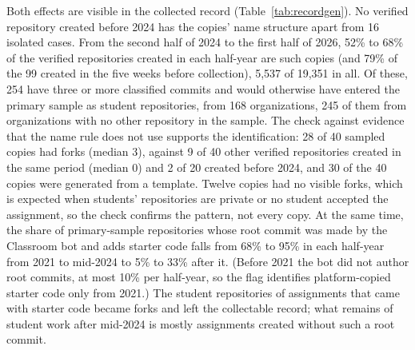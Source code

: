 \documentclass[acmsmall,screen,review,anonymous]{acmart}
\begin{document}
Both effects are visible in the collected record (Table~\ref{tab:recordgen}). No verified repository created before 2024 has the copies' name structure apart from 16 isolated cases. From the second half of 2024 to the first half of 2026, 52\% to 68\% of the verified repositories created in each half-year are such copies (and 79\% of the 99 created in the five weeks before collection), 5,537 of 19,351 in all. Of these, 254 have three or more classified commits and would otherwise have entered the primary sample as student repositories, from 168 organizations, 245 of them from organizations with no other repository in the sample. The check against evidence that the name rule does not use supports the identification: 28 of 40 sampled copies had forks (median 3), against 9 of 40 other verified repositories created in the same period (median 0) and 2 of 20 created before 2024, and 30 of the 40 copies were generated from a template. Twelve copies had no visible forks, which is expected when students' repositories are private or no student accepted the assignment, so the check confirms the pattern, not every copy. At the same time, the share of primary-sample repositories whose root commit was made by the Classroom bot and adds starter code falls from 68\% to 95\% in each half-year from 2021 to mid-2024 to 5\% to 33\% after it. (Before 2021 the bot did not author root commits, at most 10\% per half-year, so the flag identifies platform-copied starter code only from 2021.) The student repositories of assignments that came with starter code became forks and left the collectable record; what remains of student work after mid-2024 is mostly assignments created without such a root commit.
\end{document}
